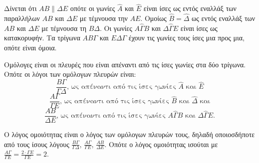 \begin{alist}
    \item Δίνεται ότι $AB \parallel \Delta E$ οπότε οι γωνίες $\widehat{A}$ και $\widehat{E}$ είναι ίσες ως εντός εναλλάξ των παραλλήλων $AB$ και $\Delta E$ με τέμνουσα την $AE$. Ομοίως $\widehat{B} = \widehat{\Delta}$ ως εντός εναλλάξ των $AB$ και $\Delta E$ με τέμνουσα τη $B\Delta$. Οι γωνίες $A\widehat{\Gamma}B$ και $\Delta\widehat{\Gamma}E$ είναι ίσες ως κατακορυφήν. Τα τρίγωνα $AB\Gamma$ και $E\Delta\Gamma$ έχουν τις γωνίες τους ίσες μια προς μια, οπότε είναι όμοια.
    \item
    \begin{rlist}
        \item Ομόλογες είναι οι πλευρές που είναι απέναντι από τις ίσες γωνίες στα δύο τρίγωνα.
        Οπότε οι λόγοι των ομόλογων πλευρών είναι:
        \[
        \frac{B\Gamma}{\Gamma\Delta} \text{, ως απέναντι από τις ίσες γωνίες } \widehat{A} \text{ και } \widehat{E}
        \]
        \[
        \frac{A\Gamma}{\Gamma E} \text{, ως απέναντι από τις ίσες γωνίες } \widehat{B} \text{ και } \widehat{\Delta} \text{ και}
        \]
        \[
        \frac{AB}{\Delta E} \text{, ως απέναντι από τις ίσες γωνίες } A\widehat{\Gamma}B \text{ και } \Delta\widehat{\Gamma}E.
        \]
        \item Ο λόγος ομοιότητας είναι ο λόγος των ομόλογων πλευρών τους, δηλαδή οποιοσδήποτε από τους ίσους λόγους $\frac{B\Gamma}{\Gamma\Delta}$, $\frac{A\Gamma}{\Gamma E}$, $\frac{AB}{\Delta E}$. Οπότε ο λόγος ομοιότητας ισούται με $\frac{A\Gamma}{\Gamma E} = \frac{2\cdot\Gamma E}{\Gamma E} = 2$.
    \end{rlist}
\end{alist}